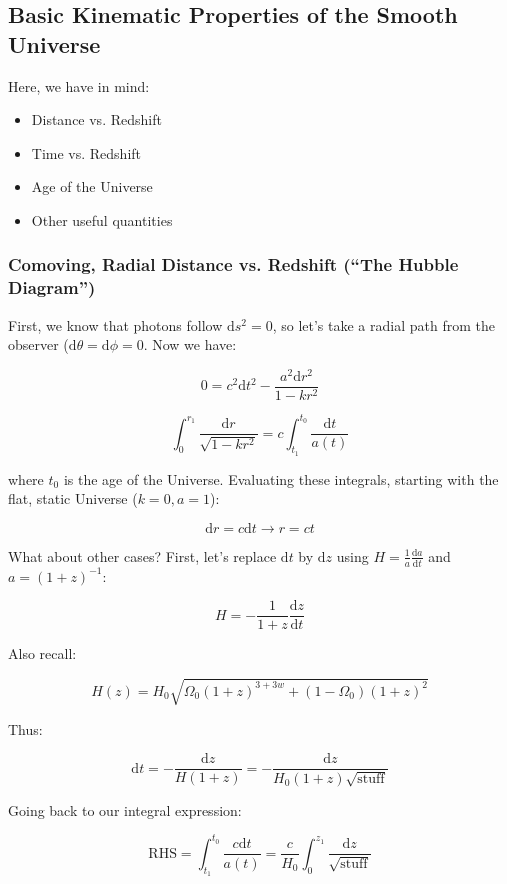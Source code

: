 \documentclass{article}
\newcommand{\be}{\begin{equation}}
\newcommand{\ee}{\end{equation}}
\begin{document}
\subsection{Basic Kinematic Properties of the Smooth Universe}

Here, we have in mind:

\begin{itemize}
    \item Distance vs. Redshift
    \item Time vs. Redshift
    \item Age of the Universe
    \item Other useful quantities
\end{itemize}

\subsubsection{Comoving, Radial Distance vs. Redshift (``The Hubble Diagram'')}

First, we know that photons follow $\mathrm{d}s^2 = 0$, so let's take a radial path from the observer ($\mathrm{d}\theta = \mathrm{d}\phi = 0$. Now we have:

\be
0 = c^2 \mathrm{d}t^2 - \frac{a^2 \mathrm{d}r^2}{1-kr^2}
\ee

\be
\int_{0}^{r_1} \frac{\mathrm{d}r}{\sqrt{1-kr^2}} = c\int_{t_1}^{t_0} \frac{\mathrm{d}t}{a(t)}
\ee

where $t_0$ is the age of the Universe. Evaluating these integrals, starting with the flat, static Universe ($k=0, a=1$):

\be
\mathrm{d}r = c \mathrm{d}t \rightarrow r = ct
\ee

What about other cases? First, let's replace $\mathrm{d}t$ by $\mathrm{d}z$ using $H = \frac{1}{a}\frac{\mathrm{d}a}{\mathrm{d}t}$ and $a = (1+z)^{-1}$:

\be
H =-\frac{1}{1+z} \frac{\mathrm{d}z}{\mathrm{d}t}
\ee

Also recall:

\be
H\left(z\right) = H_0 
\sqrt{\Omega_0 \left(1+z\right)^{3+3w} + \left(1-\Omega_0\right)\left(1+z\right)^2}
\ee

Thus:

\be
\mathrm{d}t = - \frac{\mathrm{d}z}{H(1+z)} = -\frac{\mathrm{d}z}{H_0\left(1+z\right)\sqrt{\text{stuff}}}
\ee

Going back to our integral expression:

\be
\text{RHS} = \int_{t_1}^{t_0} \frac{c\mathrm{d}t}{a(t)} = \frac{c}{H_0} \int_{0}^{z_1} \frac{\mathrm{d}z}{\sqrt{\text{stuff}}}
\ee
\end{document}
